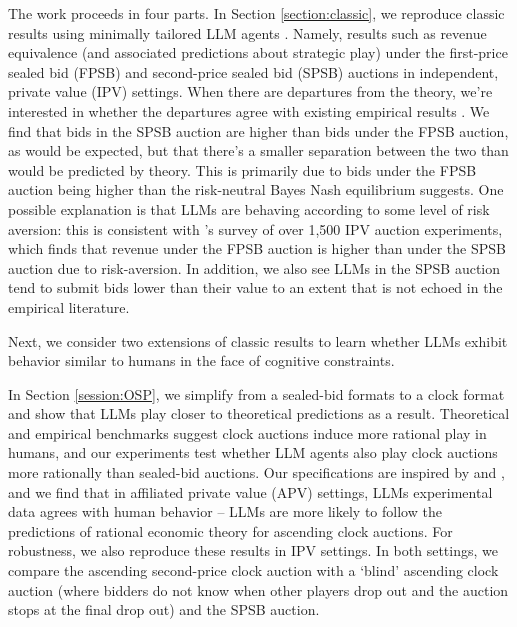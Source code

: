 \documentclass{article} %
\begin{document}
The work proceeds in four parts. 
In Section \ref{section:classic}, we reproduce classic results using minimally tailored LLM agents \citep{krishna2009auction}. 
Namely, results such as revenue equivalence (and associated predictions about strategic play) under the first-price sealed bid (FPSB) and second-price sealed bid (SPSB) auctions in independent, private value (IPV) settings. 
When there are departures from the theory, we’re interested in whether the departures agree with existing empirical results \citep{kagel2020handbook}. 
We find that bids in the SPSB auction are higher than bids under the FPSB auction, as would be expected, but that there’s a smaller separation between the two than would be predicted by theory. 
This is primarily due to bids under the FPSB auction being higher than the risk-neutral Bayes Nash equilibrium suggests. 
One possible explanation is that LLMs are behaving according to some level of risk aversion: this is consistent with \citet{cox1986controlled}'s survey of over 1,500 IPV auction experiments, which finds that revenue under the FPSB auction is higher than under the SPSB auction due to risk-aversion. 
In addition, we also see LLMs in the SPSB auction tend to submit bids lower than their value to an extent that is not echoed in the empirical literature. 

Next, we consider two extensions of classic results to learn whether LLMs exhibit behavior similar to humans in the face of cognitive constraints.

In Section \ref{session:OSP}, we simplify from a sealed-bid formats to a clock format and show that LLMs play closer to theoretical predictions as a result. 
Theoretical and empirical benchmarks suggest clock auctions induce more rational play in humans, and our experiments test whether LLM agents also play clock auctions more rationally than sealed-bid auctions. 
Our specifications are inspired by \citet{li2017obviously} and \citet{breitmoser2022obviousness}, and we find that in affiliated private value (APV) settings, LLMs experimental data agrees with human behavior -- LLMs are more likely to follow the predictions of rational economic theory for ascending clock auctions. 
For robustness, we also reproduce these results in IPV settings. 
In both settings, we compare the ascending second-price clock auction with a `blind' ascending clock auction (where bidders do not know when other players drop out and the auction stops at the final drop out) and the SPSB auction. 
\end{document}
